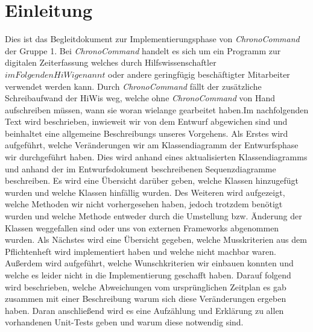 \section{Einleitung}

Dies ist das Begleitdokument zur Implementierungsphase von \emph{ChronoCommand} der Gruppe 1. Bei \emph{ChronoCommand} handelt
es sich um ein Programm zur digitalen Zeiterfassung welches durch Hilfswissenschaftler \(im Folgenden HiWi genannt\) oder andere
geringfügig beschäftigter Mitarbeiter verwendet werden kann. Durch \emph{ChronoCommand} fällt der zusätzliche Schreibaufwand der HiWis weg, welche ohne
\emph{ChronoCommand} von Hand aufschreiben müssen, wann sie woran wielange gearbeitet haben.Im nachfolgenden Text wird 
beschrieben, inwieweit wir von dem Entwurf abgewichen sind und beinhaltet eine allgemeine Beschreibungs unseres Vorgehens.
Als Erstes wird aufgeführt, welche Veränderungen wir am Klassendiagramm der Entwurfsphase wir durchgeführt haben. 
Dies wird anhand eines aktualisierten Klassendiagramms und anhand der im Entwurfsdokument beschreibenen Sequenzdiagramme 
beschreiben. Es wird eine Übersicht darüber geben, welche Klassen hinzugefügt wurden und welche Klassen hinfällig wurden. Des 
Weiteren wird aufgezeigt, welche Methoden wir nicht vorhergesehen haben, jedoch trotzdem benötigt wurden und welche Methode 
entweder durch die Umstellung bzw. Änderung der Klassen weggefallen sind oder uns von externen Frameworks abgenommen wurden.
Als Nächstes wird eine Übersicht gegeben, welche Musskriterien aus dem Pflichtenheft wird implementiert haben und welche nicht
machbar waren. Außerdem wird aufgeführt, welche Wunschkriterien wir einbauen konnten und welche es leider nicht in die 
Implementierung geschafft haben. Darauf folgend wird beschrieben, welche Abweichungen vom ursprünglichen Zeitplan es gab 
zusammen mit einer Beschreibung warum sich diese Veränderungen ergeben haben. Daran anschließend wird es eine Aufzählung und Erklärung zu allen vorhandenen Unit-Tests geben und warum diese notwendig sind.
